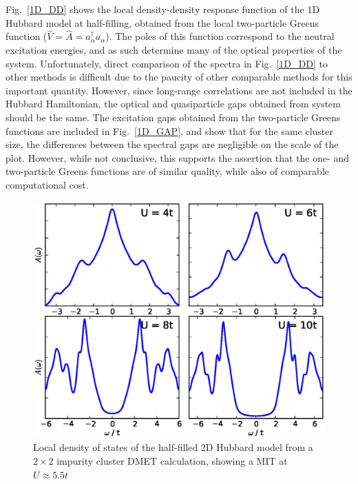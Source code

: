 \documentclass[aps,showpacs,twocolumn,nobibnotes]{revtex4}
\begin{document}
Fig.~\ref{1D_DD} shows the local density-density response function of the 1D Hubbard model at half-filling, obtained from the local two-particle Greens 
function (${\hat V}={\hat A}=a_{\alpha}^{\dagger}a_{\alpha}$). The poles of this function correspond to the neutral excitation energies, and as such determine 
many of the optical properties of the system\cite{Millis2012,Essler91}.
Unfortunately, direct comparison of the spectra in Fig.~\ref{1D_DD} to other methods is difficult due to the paucity of other comparable methods for this important quantity.
However, since long-range correlations are not included in the Hubbard Hamiltonian, 
the optical and quasiparticle gaps obtained from system should be the same. The excitation gaps
obtained from the two-particle Greens functions are included in Fig.~\ref{1D_GAP}, and show that for the same cluster size, the differences between the spectral gaps are negligible 
on the scale of the plot. However, while not conclusive, this supports the assertion that the one- and two-particle Greens functions are of similar quality, while also of comparable computational cost.

\begin{figure}
\begin{center}
    \vspace{-2mm}
\includegraphics[scale=0.475]{Plots/2D_Spectra/2DHub_Spectra.eps}
\end{center}
    \vspace{-8mm}
\caption{Local density of states of the half-filled 2D Hubbard model from a $2 \times 2$ impurity cluster DMET calculation, showing a MIT at $U\approx5.5t$}
\label{2D_DOS}
\end{figure}
\end{document}
